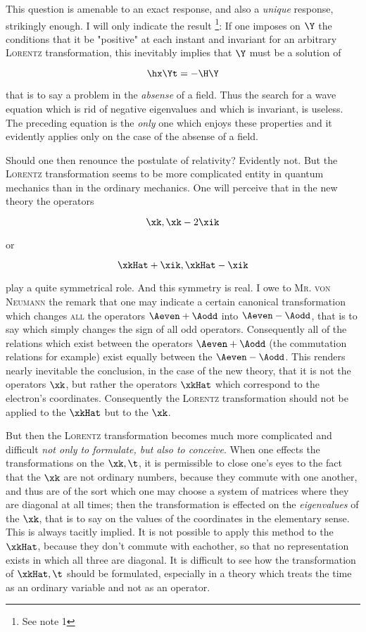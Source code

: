 \documentclass{article}
\newcommand{\uequ}[1]{
\begin{equation*}
#1
\end{equation*}
}
\renewcommand{\it}[1]{\textit{#1}}
\renewcommand{\sc}[1]{\textsc{#1}}
\begin{document}
This question is amenable to an exact response, and also a \it{unique} response, strikingly enough. I will only indicate the result \footnote{See note 1}: If one imposes on $\Y$ the conditions that it be "positive" at each instant and invariant for an arbitrary \sc{Lorentz} transformation, this inevitably implies that $\Y$ must be a solution of
\uequ{
\hx\Yt = -\H\Y
}
that is to say a problem in the \it{absense} of a field. Thus the search for a wave equation which is rid of negative eigenvalues and which is invariant, is useless. The preceding equation is the \it{only} one which enjoys these properties and it evidently applies only on the case of the absense of a field.

Should one then renounce the postulate of relativity? Evidently not. But the \sc{Lorentz} transformation seems to be more complicated entity in quantum mechanics than in the ordinary mechanics. One will perceive that in the new theory the operators
\uequ{
\xk, \xk - 2\xik
}
or
\uequ{
\xkHat + \xik, \xkHat - \xik
}
play a quite symmetrical role. And this symmetry is real. I owe to \sc{Mr. von Neumann} the remark that one may indicate a certain canonical transformation which changes \sc{all} the operators $\Aeven + \Aodd$ into $\Aeven - \Aodd$, that is to say which simply changes the sign of all odd operators. Consequently all of the relations which exist between the operators $\Aeven + \Aodd$ (the commutation relations for example) exist equally between the $\Aeven - \Aodd$. This renders nearly inevitable the conclusion, in the case of the new theory, that it is not the operators $\xk$, but rather the operators $\xkHat$ which correspond to the electron's coordinates. Consequently the \sc{Lorentz} transformation should not be applied to the $\xkHat$ but to the $\xk$.

But then the \sc{Lorentz} transformation becomes much more complicated and difficult \it{not only to formulate, but also to conceive}. When one effects the transformations on the $\xk, \t$, it is permissible to close one's eyes to the fact that the $\xk$ are not ordinary numbers, because they commute with one another, and thus are of the sort which one may choose a system of matrices where they are diagonal at all times; then the transformation is effected on the \it{eigenvalues} of the $\xk$, that is to say on the values of the coordinates in the elementary sense. This is always tacitly implied. It is not possible to apply this method to the $\xkHat$, because they don't commute with eachother, so that no representation exists in which all three are diagonal. It is difficult to see how the transformation of $\xkHat, \t$ should be formulated, especially in a theory which treats the time as an ordinary variable and not as an operator.
\end{document}
